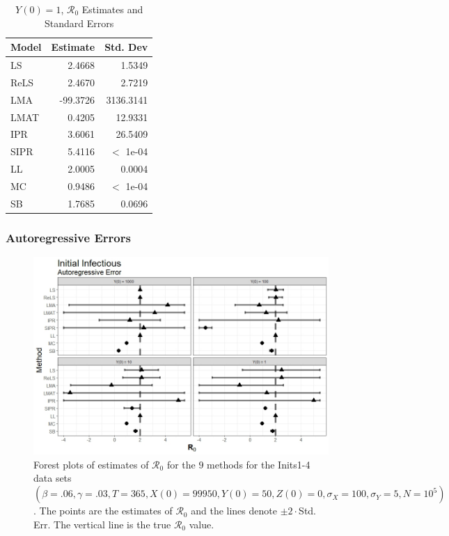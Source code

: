 \documentclass[12pt]{article}
\newcommand{\xxsir}{\ensuremath{9} } %
\newcommand{\rr}{\ensuremath{\mathcal{R}_0}}
\begin{document}
\begin{table}[H]
	
	\centering
	\begin{tabular}[t]{l|r|r}
		\hline
		Model & Estimate & Std. Dev\\
		\hline
		LS & 2.4668 & 1.5349\\
		\hline
		ReLS & 2.4670 & 2.7219\\
		\hline
		LMA & -99.3726 & 3136.3141\\
		\hline
		LMAT & 0.4205 & 12.9331\\
		\hline
		IPR & 3.6061 & 26.5409\\
		\hline
		SIPR & 5.4116 & $<$ 1e-04\\
		\hline
		LL & 2.0005 & 0.0004\\
		\hline
		MC & 0.9486 & $<$ 1e-04\\
		\hline
		SB & 1.7685 & 0.0696\\
		\hline
	\end{tabular}
	\caption{$Y(0) = 1$, $\rr$ Estimates and Standard Errors}
\end{table}


\subsubsection{Autoregressive Errors}

\begin{figure}[H]
	\centering
	\includegraphics[scale=0.5]{images/start_ar.jpeg}
	\caption{Forest plots of estimates of $\rr$ for the \xxsir methods for the Inits1-4 data sets $(\beta=.06, \gamma=.03, T=365, X(0)=99950, Y(0)=50, Z(0)=0, \sigma_X=100, \sigma_Y=5, N=10^5)$.  The points are the estimates of $\rr$ and the lines denote $\pm 2\cdot $Std. Err.  The vertical line is the true $\rr$ value.}
\end{figure}
\end{document}
